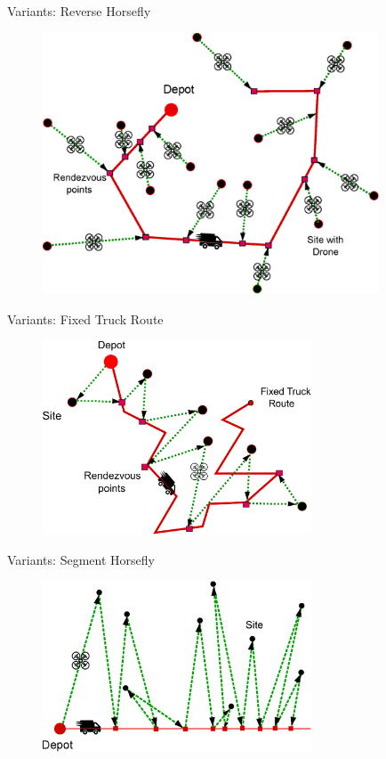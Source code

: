 \documentclass{beamer}
\begin{document}
\begin{frame}{Variants: Reverse Horsefly}
  \begin{figure}
    \centeringe
        \includegraphics[width=10.0cm]{slide_imgs/reverse_horsefly.eps}
  \end{figure}

\end{frame}


\begin{frame}{Variants: Fixed Truck Route}
\begin{figure}
    \centering
        \includegraphics[width=8.0cm]{slide_imgs/fixed_truck_route_variant.eps}
  \end{figure}

\end{frame}


\begin{frame}{Variants: Segment Horsefly}
\begin{figure}
    \centering
        \includegraphics[width=8.0cm]{slide_imgs/segment_horsefly.eps}
  \end{figure}

\end{frame}
\end{document}
